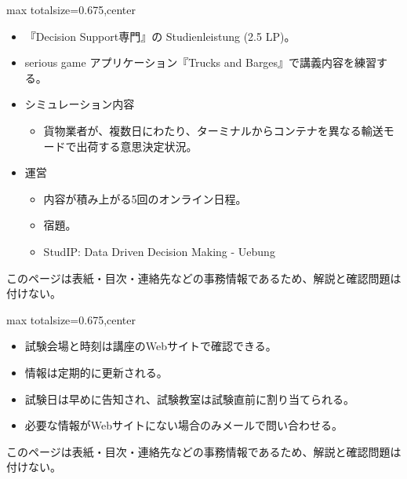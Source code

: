 \clearpage
{}
\begin{adjustbox}{max totalsize={\textwidth}{0.675\textheight},center}
\begin{minipage}{\textwidth}\scriptsize
\begin{minipage}[t]{0.485\textwidth}
\begin{itemize}
\item 『Decision Support専門』の Studienleistung (2.5 LP)。
\item serious game アプリケーション『Trucks and Barges』で講義内容を練習する。
\item シミュレーション内容
\begin{itemize}
\item 貨物業者が、複数日にわたり、ターミナルからコンテナを異なる輸送モードで出荷する意思決定状況。
\end{itemize}
\item 運営
\begin{itemize}
\item 内容が積み上がる5回のオンライン日程。
\item 宿題。
\item StudIP: Data Driven Decision Making - Uebung
\end{itemize}
\end{itemize}
\end{minipage}\hfill
\begin{minipage}[t]{0.485\textwidth}
{\small このページは表紙・目次・連絡先などの事務情報であるため、解説と確認問題は付けない。}
\end{minipage}
\end{minipage}
\end{adjustbox}

\clearpage
{}
\begin{adjustbox}{max totalsize={\textwidth}{0.675\textheight},center}
\begin{minipage}{\textwidth}\scriptsize
\begin{minipage}[t]{0.485\textwidth}
\begin{itemize}
\item 試験会場と時刻は講座のWebサイトで確認できる。
\item 情報は定期的に更新される。
\item 試験日は早めに告知され、試験教室は試験直前に割り当てられる。
\item 必要な情報がWebサイトにない場合のみメールで問い合わせる。
\end{itemize}
\end{minipage}\hfill
\begin{minipage}[t]{0.485\textwidth}
{\small このページは表紙・目次・連絡先などの事務情報であるため、解説と確認問題は付けない。}
\end{minipage}
\end{minipage}
\end{adjustbox}

